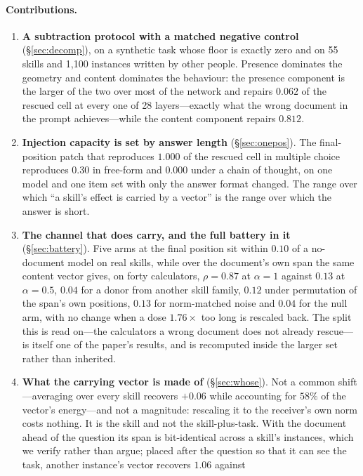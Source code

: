 \documentclass{article}
\begin{document}
\paragraph{Contributions.}
\begin{enumerate}
\item \textbf{A subtraction protocol with a matched negative control}
(\S\ref{sec:decomp}), on a synthetic task whose floor is exactly zero and on 55
skills and 1{,}100 instances written by other people. Presence dominates the
geometry and content dominates the behaviour: the presence component is the
larger of the two over most of the network and repairs $0.062$ of the rescued
cell at every one of 28 layers---exactly what the wrong document in the prompt
achieves---while the content component repairs $0.812$.
\item \textbf{Injection capacity is set by answer length} (\S\ref{sec:onepos}).
The final-position patch that reproduces $1.000$ of the rescued cell in multiple
choice reproduces $0.30$ in free-form and $0.000$ under a chain of thought, on
one model and one item set with only the answer format changed. The range over
which ``a skill's effect is carried by a vector'' is the range over which the
answer is short.
\item \textbf{The channel that does carry, and the full battery in it}
(\S\ref{sec:battery}). Five arms at the final position sit within $0.10$ of a
no-document model on real skills, while over the document's own span the same
content vector gives, on forty calculators, $\rho = 0.87$ at $\alpha=1$ against
$0.13$ at $\alpha=0.5$, $0.04$ for a donor from another skill family, $0.12$
under permutation of the span's own positions, $0.13$ for norm-matched noise and
$0.04$ for the null arm, with no change when a dose $1.76\times$ too long is
rescaled back. The split this is read on---the calculators a wrong document does
not already rescue---is itself one of the paper's results, and is recomputed
inside the larger set rather than inherited.
\item \textbf{What the carrying vector is made of} (\S\ref{sec:whose}). Not a
common shift---averaging over every skill recovers $+0.06$ while accounting for
$58\%$ of the vector's energy---and not a magnitude: rescaling it to the
receiver's own norm costs nothing. It is the skill and not the skill-plus-task.
With the document ahead of the question its span is bit-identical across a
skill's instances, which we verify rather than argue; placed after the question
so that it can see the task, another instance's vector recovers $1.06$ against

\end{enumerate}
\end{document}
